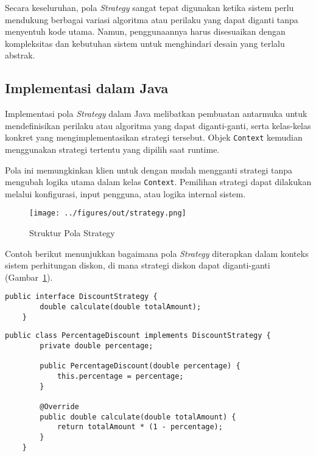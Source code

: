 Secara keseluruhan, pola \textit{Strategy} sangat tepat digunakan ketika sistem perlu mendukung berbagai variasi algoritma atau perilaku yang dapat diganti tanpa menyentuh kode utama. Namun, penggunaannya harus disesuaikan dengan kompleksitas dan kebutuhan sistem untuk menghindari desain yang terlalu abstrak.

\subsection{Implementasi dalam Java}

Implementasi pola \textit{Strategy} dalam Java melibatkan pembuatan antarmuka untuk mendefinisikan perilaku atau algoritma yang dapat diganti-ganti, serta kelas-kelas konkret yang mengimplementasikan strategi tersebut. Objek \texttt{Context} kemudian menggunakan strategi tertentu yang dipilih saat runtime.

Pola ini memungkinkan klien untuk dengan mudah mengganti strategi tanpa mengubah logika utama dalam kelas \texttt{Context}. Pemilihan strategi dapat dilakukan melalui konfigurasi, input pengguna, atau logika internal sistem.

\begin{figure}[h]
	\centering
	\texttt{[image: ../figures/out/strategy.png]}
	\caption{Struktur Pola Strategy}
	\label{fig:strategy}
\end{figure}

Contoh berikut menunjukkan bagaimana pola \textit{Strategy} diterapkan dalam konteks sistem perhitungan diskon, di mana strategi diskon dapat diganti-ganti (Gambar~\ref{fig:strategy}).

\begin{lstlisting}[style=JavaStyle, caption={Antarmuka Strategy}, label={lst:strategy-interface}]
	public interface DiscountStrategy {
		double calculate(double totalAmount);
	}
\end{lstlisting}

\begin{lstlisting}[style=JavaStyle, caption={Strategi Diskon Persentase}, label={lst:strategy-percentage}]
	public class PercentageDiscount implements DiscountStrategy {
		private double percentage;
		
		public PercentageDiscount(double percentage) {
			this.percentage = percentage;
		}
		
		@Override
		public double calculate(double totalAmount) {
			return totalAmount * (1 - percentage);
		}
	}
\end{lstlisting}

